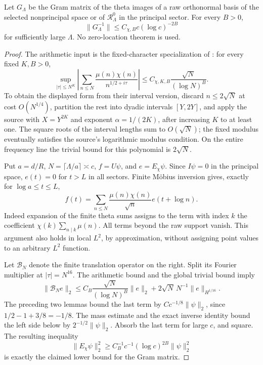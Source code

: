 \begin{proposition}
\label{prop:gram-control}
Let $G_\Lambda$ be the Gram matrix of the theta images of a raw
orthonormal basis of the selected nonprincipal space or of
$\mathcal R_\Lambda^0$ in the principal sector. For every $B>0$,
\[
 \|G_\Lambda^{-1}\|\leq C_{\chi,B}
                          c(\log c)^{-2B}
\]
for sufficiently large $\Lambda$. No zero-location theorem is used.
\end{proposition}
\begin{proof}
The arithmetic input is the fixed-character specialization of
\citet[Lemma 3.9(ii), pp.~46--47]{mstt2023}:
for every fixed $K,B>0$,
\[
 \sup_{|\tau|\leq N^K}
 \left|\sum_{n\leq N}\frac{\mu(n)\chi(n)}{n^{1/2+i\tau}}\right|
        \leq C_{\chi,K,B}\frac{\sqrt N}{(\log N)^B}.
\]
To obtain the displayed form from their interval version, discard
$n\leq2\sqrt N$ at cost $O(N^{1/4})$, partition the rest into
dyadic intervals $[Y,2Y]$, and apply the source with $X=Y^{2K}$
and exponent $\alpha=1/(2K)$, after increasing $K$ to at least one.
The square roots of the interval lengths sum to $O(\sqrt N)$;
the fixed modulus eventually satisfies the source's logarithmic
modulus condition. On the entire frequency line the trivial bound
for this polynomial is $2\sqrt N$.

Put $a=d/R$, $N=\lceil\Lambda/a\rceil\asymp c$,
$f=U\psi$, and $e=E_\chi\psi$. Since $I\psi=0$ in the
principal space, $e(t)=0$ for $t>L$ in all sectors. Finite M\"obius
inversion gives, exactly for $\log a\leq t\leq L$,
\[
 f(t)=\sum_{n\leq N}\frac{\mu(n)\chi(n)}{\sqrt n}
                                           e(t+\log n).
\]
Indeed expansion of the finite theta sums assigns to the term with
index $k$ the coefficient $\chi(k)\sum_{n\mid k}\mu(n)$.
All terms beyond the raw support vanish. This argument also holds
in local $L^2$, by approximation, without assigning point values
to an arbitrary $L^2$ function.

Let $\mathcal B_N$ denote the finite translation operator on the
right. Split its Fourier multiplier at $|\tau|=N^{16}$.
The arithmetic bound and the global trivial bound imply
\[
 \|\mathcal B_N e\|_2\leq
 C_B\frac{\sqrt N}{(\log N)^B}\|e\|_2
       +2\sqrt N\,N^{-1}\|e\|_{H^{1/16}}.
\]
The preceding two lemmas bound the last term by
$C c^{-1/8}\|\psi\|_2$, since $1/2-1+3/8=-1/8$.
The mass estimate and the exact inverse identity bound the left
side below by $2^{-1/2}\|\psi\|_2$. Absorb the last term for
large $c$, and square. The resulting inequality
\[
 \|E_\chi\psi\|_2^2\geq C_B^{-1}
                 c^{-1}(\log c)^{2B}\|\psi\|_2^2
\]
is exactly the claimed lower bound for the Gram matrix.
\end{proof}
